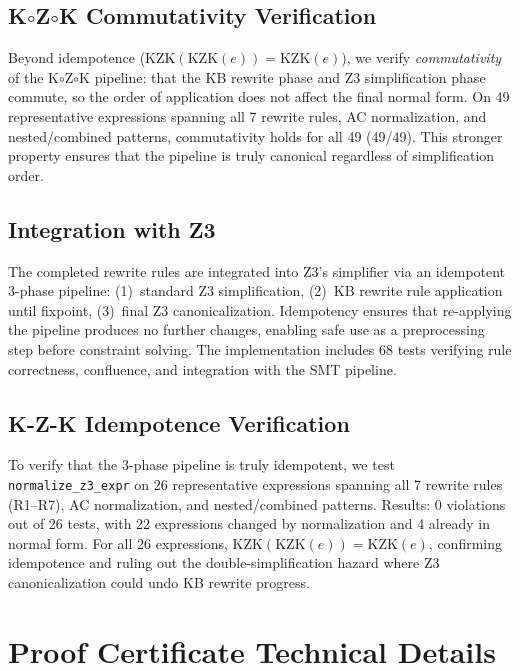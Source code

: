 \documentclass[11pt]{article}
\begin{document}
\subsection{K$\circ$Z$\circ$K Commutativity Verification}

Beyond idempotence ($\mathrm{KZK}(\mathrm{KZK}(e)) = \mathrm{KZK}(e)$),
we verify \emph{commutativity} of the K$\circ$Z$\circ$K pipeline:
that the KB rewrite phase and Z3 simplification phase commute, so
the order of application does not affect the final normal form.
On 49 representative expressions spanning all 7 rewrite rules, AC
normalization, and nested/combined patterns, commutativity holds for
all 49 (49/49).  This stronger property ensures that the pipeline
is truly canonical regardless of simplification order.

\subsection{Integration with Z3}

The completed rewrite rules are integrated into Z3's simplifier
via an idempotent 3-phase pipeline: (1)~standard Z3 simplification,
(2)~KB rewrite rule application until fixpoint, (3)~final Z3
canonicalization.  Idempotency ensures that re-applying the
pipeline produces no further changes, enabling safe use as a
preprocessing step before constraint solving.  The implementation
includes 68 tests verifying rule correctness, confluence, and
integration with the SMT pipeline.

\subsection{K-Z-K Idempotence Verification}

To verify that the 3-phase pipeline is truly idempotent, we test
\texttt{normalize\_z3\_expr} on 26 representative expressions spanning
all 7 rewrite rules (R1--R7), AC normalization, and nested/combined
patterns.  Results: 0 violations out of 26 tests, with 22 expressions
changed by normalization and 4 already in normal form.  For all 26
expressions, $\mathrm{KZK}(\mathrm{KZK}(e)) = \mathrm{KZK}(e)$,
confirming idempotence and ruling out the double-simplification hazard
where Z3 canonicalization could undo KB rewrite progress.


\section{Proof Certificate Technical Details}\label{app:proof-cert-details}
\end{document}
